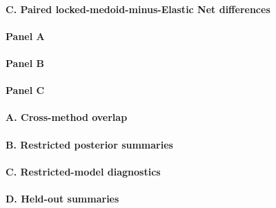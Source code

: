 

\paragraph*{C. Paired locked-medoid-minus-Elastic Net differences}









\paragraph*{Panel A}



\paragraph*{Panel B}



\paragraph*{Panel C}



\paragraph*{A. Cross-method overlap}



\paragraph*{B. Restricted posterior summaries}



\paragraph*{C. Restricted-model diagnostics}



\paragraph*{D. Held-out summaries}

